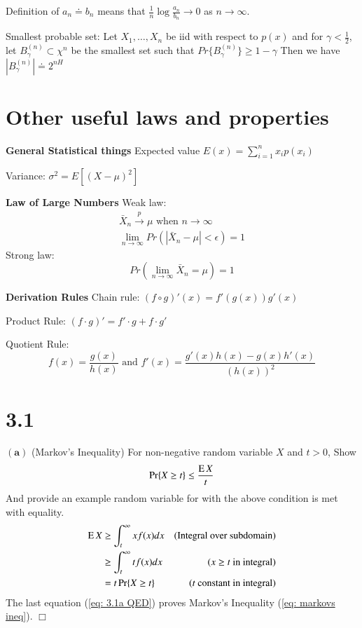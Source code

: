 \documentclass[10pt]{article}
\DeclareMathOperator*{\E}{\mbox{\text{E}}}
\newcommand{\pref}[1]{{(\ref{#1})}}
\begin{document}
\begin{tiny}
\begin{multicols}{3}
Definition of $a_n \doteq b_n$ means that $\frac{1}{n}\log \frac{a_n}{b_n} \rightarrow 0$ as $n\rightarrow \infty$.

Smallest probable set: Let $X_1,\ldots, X_n$ be iid with respect to $p(x)$ and for $\gamma < \frac{1}{2}$, let $B_\gamma^{(n)} \subset \chi^n$ be the smallest set such that $Pr\{ B_\gamma^{(n)} \} \geq 1-\gamma $ Then we have $|B_\gamma^{(n)}| \doteq 2^{nH}$

\section*{Other useful laws and properties}
{\bf General Statistical things} Expected value $E(x)=\sum_{i=1}^n x_i p(x_i)$

Variance: $\sigma^2 = E\left[ \left(X-\mu\right)^2\right]$

{\bf Law of Large Numbers} Weak law:
\begin{eqnarray*}
\bar{X}_n\overset{p}\rightarrow \mu \text{ when } n \rightarrow \infty\\
\lim_{n\rightarrow \infty} Pr\left(|\bar{X}_n-\mu| < \epsilon \right) = 1
\end{eqnarray*}
Strong law:
\begin{equation}
Pr\left(\lim_{n\rightarrow \infty} \bar{X}_n = \mu \right) = 1
\end{equation}

{\bf Derivation Rules} Chain rule: $(f \circ g)'(x)=f'(g(x))g'(x)$

Product Rule: $(f\cdot g)' = f' \cdot g + f \cdot g'$

Quotient Rule: \[f(x)=\frac{g(x)}{h(x)}\text{ and }f'(x)=\frac{g'(x)h(x)-g(x)h'(x)}{\left(h(x)\right)^2}\]


\section*{3.1}
$\mathbf{(a)}$
(Markov's Inequality) For non-negative random variable $X$ and  $t>0$,
Show
\begin{equation}
    \Pr\{X \geq t\} \leq \frac{\E X}{t} \label{eq: markovs ineq}
\end{equation}
And provide an example random variable for with the above condition is met
with equality.
\proof
\begin{eqnarray}
    \E X %
    &\geq \int_t^\infty x f(x)dx &\text{(Integral over subdomain)} 
    \nonumber \\
    &\geq \int_t^\infty t f(x)dx &\text{($x \geq t$ in integral)} 
        \nonumber \\
    &= t \Pr\{X \geq t\}  &\text{($t$ constant in integral)}
        \label{eq: 3.1a QED}
\end{eqnarray}
The last equation \pref{eq: 3.1a QED} proves Markov's Inequality
\pref{eq: markovs ineq}. $\Box$


\end{multicols}
\end{tiny}
\end{document}
